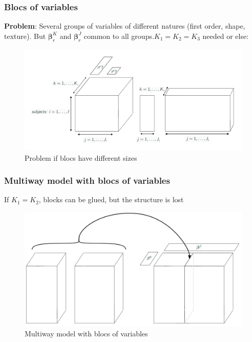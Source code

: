 \documentclass{beamer}
\begin{document}
\begin{frame}
 \frametitle{Blocs of variables}

 \textbf{Problem}: Several groups of variables of different natures (first order, shape, texture). But $\bm{\beta}_r^{K}$ and $\bm{\beta}_r^J$ common to all groups.$K_1 = K_2 = K_3$ needed or else:

 \begin{figure}
    \centering
    \includegraphics[scale = 0.23]{images/blocks_faux.png}
    \caption{Problem if blocs have different sizes}
\end{figure}

\end{frame}

\begin{frame}
    \frametitle{Multiway model with blocs of variables}
    If $K_1 = K_2$, blocks can be glued, but the structure is lost
    \begin{figure}
        \centering
        \includegraphics[scale = 0.2]{images/glue_blocks.png}
        \caption{Multiway model with blocs of variables}
    \end{figure}
\end{frame}
\end{document}
